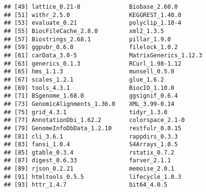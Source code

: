 \documentclass[
]{article}
\begin{document}
\begin{verbatim}
## [49] lattice_0.21-8              Biobase_2.60.0             
## [51] withr_2.5.0                 KEGGREST_1.40.0            
## [53] evaluate_0.21               polyclip_1.10-4            
## [55] BiocFileCache_2.8.0         xml2_1.3.5                 
## [57] Biostrings_2.68.1           pillar_1.9.0               
## [59] ggpubr_0.6.0                filelock_1.0.2             
## [61] carData_3.0-5               MatrixGenerics_1.12.3      
## [63] generics_0.1.3              RCurl_1.98-1.12            
## [65] hms_1.1.3                   munsell_0.5.0              
## [67] scales_1.2.1                glue_1.6.2                 
## [69] tools_4.3.1                 BiocIO_1.10.0              
## [71] BSgenome_1.68.0             ggsignif_0.6.4             
## [73] GenomicAlignments_1.36.0    XML_3.99-0.14              
## [75] grid_4.3.1                  tidyr_1.3.0                
## [77] AnnotationDbi_1.62.2        colorspace_2.1-0           
## [79] GenomeInfoDbData_1.2.10     restfulr_0.0.15            
## [81] cli_3.6.1                   rappdirs_0.3.3             
## [83] fansi_1.0.4                 S4Arrays_1.0.5             
## [85] gtable_0.3.4                rstatix_0.7.2              
## [87] digest_0.6.33               farver_2.1.1               
## [89] rjson_0.2.21                memoise_2.0.1              
## [91] htmltools_0.5.5             lifecycle_1.0.3            
## [93] httr_1.4.7                  bit64_4.0.5
\end{verbatim}
\end{document}
